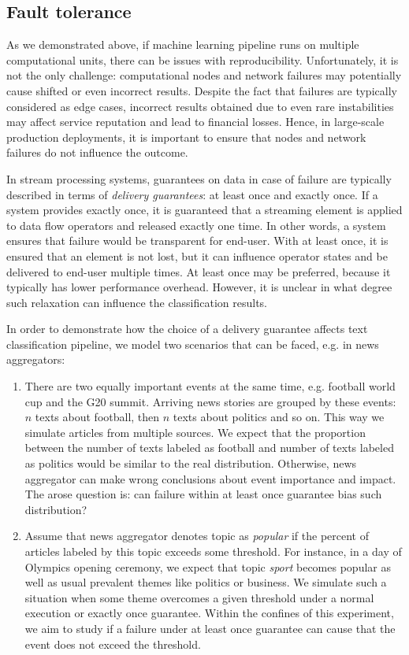 \subsection{Fault tolerance}

As we demonstrated above, if machine learning pipeline runs on multiple computational units, there can be issues with reproducibility. Unfortunately, it is not the only challenge: computational nodes and network failures may potentially cause shifted or even incorrect results. Despite the fact that failures are typically considered as edge cases, incorrect results obtained due to even rare instabilities may affect service reputation and lead to financial losses. Hence, in large-scale production deployments, it is important to ensure that nodes and network failures do not influence the outcome.

In stream processing systems, guarantees on data in case of failure are typically described in terms of {\em delivery guarantees}: at least once and exactly once. If a system provides exactly once, it is guaranteed that a streaming element is applied to data flow operators and released exactly one time. In other words, a system ensures that failure would be transparent for end-user. With at least once, it is ensured that an element is not lost, but it can influence operator states and be delivered to end-user multiple times. At least once may be preferred, because it typically has lower performance overhead. However, it is unclear in what degree such relaxation can influence the classification results. 

In order to demonstrate how the choice of a delivery guarantee affects text classification pipeline, we model two scenarios that can be faced, e.g. in news aggregators:
\begin{enumerate}
    \item There are two equally important events at the same time, e.g. football world cup and the G20 summit. Arriving news stories are grouped by these events: $n$ texts about football, then $n$ texts about politics and so on. This way we simulate articles from multiple sources. We expect that the proportion between the number of texts labeled as football and number of texts labeled as politics would be similar to the real distribution. Otherwise, news aggregator can make wrong conclusions about event importance and impact. The arose question is: can failure within at least once guarantee bias such distribution?
    \item Assume that news aggregator denotes topic as {\em popular} if the percent of articles labeled by this topic exceeds some threshold. For instance, in a day of Olympics opening ceremony, we expect that topic {\em sport} becomes popular as well as usual prevalent themes like politics or business. We simulate such a situation when some theme overcomes a given threshold under a normal execution or exactly once guarantee. Within the confines of this experiment, we aim to study if a failure under at least once guarantee can cause that the event does not exceed the threshold.    
\end{enumerate}

